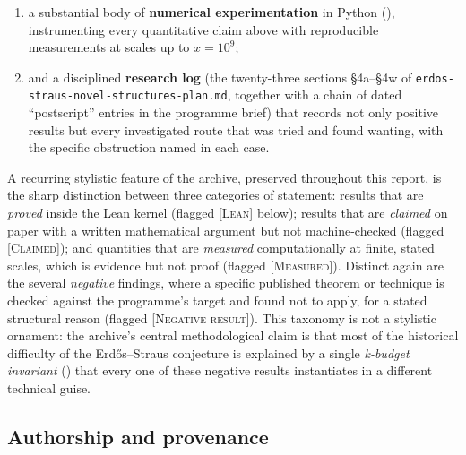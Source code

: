 \documentclass[11pt]{article}
\theoremstyle{plain}
\theoremstyle{definition}
\theoremstyle{remark}
\newcommand{\LEAN}{\textcolor{proved}{\textsc{[Lean]}}}
\newcommand{\CLAIMED}{\textcolor{claimed}{\textsc{[Claimed]}}}
\newcommand{\NEGATIVE}{\textcolor{negative}{\textsc{[Negative result]}}}
\newcommand{\MEASURED}{\textcolor{claimed}{\textsc{[Measured]}}}
\renewcommand{\_}{\textunderscore\allowbreak}
\begin{document}
\begin{enumerate}[leftmargin=1.6em]
        ES is checked directly against the classical Mordell obstruction and found not to
        establish the covering claim it needs;
  \item a substantial body of \textbf{numerical experimentation} in Python
        (), instrumenting every quantitative claim above with reproducible
        measurements at scales up to $x=10^9$;
  \item and a disciplined \textbf{research log} (the twenty-three sections \S4a--\S4w of
        \texttt{erdos-\allowbreak straus-\allowbreak novel-\allowbreak structures-\allowbreak plan.md}, together with a chain of dated
        ``postscript'' entries in the programme brief) that records not only positive results
        but every investigated route that was tried and found wanting, with the specific
        obstruction named in each case.
\end{enumerate}
A recurring stylistic feature of the archive, preserved throughout this report, is the sharp
distinction between three categories of statement: results that are \emph{proved} inside the
Lean kernel (flagged \LEAN{} below); results that are \emph{claimed} on paper with a written
mathematical argument but not machine-checked (flagged \CLAIMED{}); and quantities that are
\emph{measured} computationally at finite, stated scales, which is evidence but not proof
(flagged \MEASURED{}). Distinct again are the several \emph{negative} findings, where a
specific published theorem or technique is checked against the programme's target and found not
to apply, for a stated structural reason (flagged \NEGATIVE{}). This taxonomy is not a
stylistic ornament: the archive's central methodological claim is that most of the historical
difficulty of the Erd\H{o}s--Straus conjecture is explained by a single \emph{k-budget
invariant} () that every one of these negative results instantiates in a
different technical guise.

\subsection{Authorship and provenance}
\label{subsec:provenance}
\end{document}
